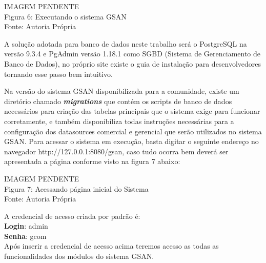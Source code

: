 \begin{center}
	IMAGEM PENDENTE \\
	Figura 6: Executando o sistema GSAN  \\
	Fonte: Autoria Própria \\
\end{center}

A solução adotada para banco de dados neste trabalho será o PostgreSQL na versão 9.3.4 e PgAdmin versão 1.18.1 como SGBD (Sistema de Gerenciamento de Banco de Dados), no próprio site existe o guia de instalação para desenvolvedores tornando esse passo bem intuitivo.

Na versão do sistema GSAN disponibilizada para a comunidade, existe um diretório chamado \textbf{\textit{migrations}} que contém os scripts de banco de dados necessários para criação das tabelas principais que o sistema exige para funcionar corretamente, e também disponibiliza todas instruções necessárias para a configuração dos datasources comercial e gerencial que serão utilizados no sistema GSAN.
Para acessar o sistema em execução, basta digitar o seguinte endereço no navegador http://127.0.0.1:8080/gsan, caso tudo ocorra bem deverá ser apresentada a página conforme visto na figura 7 abaixo:

\begin{center}
	IMAGEM PENDENTE \\
	Figura 7: Acessando página inicial do Sistema   \\
	Fonte: Autoria Própria
\end{center}

A credencial de acesso criada por padrão é: \\
\textbf{Login}: admin \\
\textbf{Senha}: gcom \\
Após inserir a credencial de acesso acima teremos acesso as todas as funcionalidades dos módulos do sistema GSAN.

